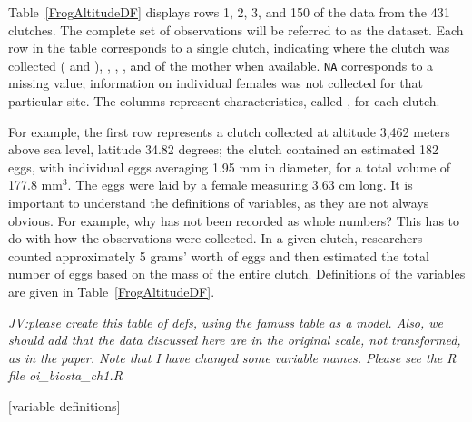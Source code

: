 \begin{doublespace}
	
 

Table~\ref{FrogAltitudeDF} displays rows 1, 2, 3, and 150 of the data from the 431 clutches. The complete set of observations will be referred to as the  dataset. Each row in the table corresponds to a single clutch, indicating where the clutch was collected ( and ), , , , and  of the mother when available. \texttt{NA} corresponds to a missing value; information on individual females was not collected for that particular site. The columns represent characteristics, called , for each clutch.

For example, the first row represents a clutch collected at altitude 3,462 meters above sea level, latitude 34.82 degrees; the clutch contained an estimated 182 eggs, with individual eggs averaging 1.95 mm in diameter, for a total volume of 177.8 mm$^{3}$. The eggs were laid by a female measuring 3.63 cm long. It is important to understand the definitions of variables, as they are not always obvious. For example, why has  not been recorded as whole numbers? This has to do with how the observations were collected. In a given clutch, researchers counted approximately 5 grams' worth of eggs and then estimated the total number of eggs based on the mass of the entire clutch. Definitions of the variables are given in Table~\ref{FrogAltitudeDF}.

\textit{JV:please create this table of defs, using the famuss table as a model.  Also, we should add that the data discussed here are in the original scale, not transformed, as in the paper.  Note that I have changed some variable names.  Please see the R file oi\_biosta\_ch1.R}

$[$variable definitions$]$

\end{doublespace}

